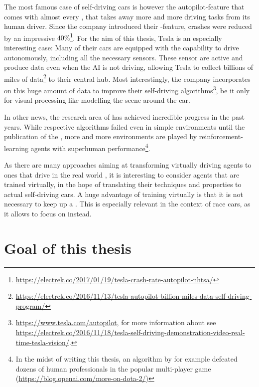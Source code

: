 The most famous case of self-driving cars is however the autopilot-feature that comes with almost every , that takes away more and more driving tasks from its human driver. Since the company introduced their -feature, crashes were reduced by an impressive $40\%$\footnote{\url{https://electrek.co/2017/01/19/tesla-crash-rate-autopilot-nhtsa/}}. For the aim of this thesis, Tesla is an especially interesting case: Many of their cars are equipped with the capability to drive autonomously, including all the necessary sensors. These sensor are active and produce data even when the AI is not driving, allowing Tesla to collect billions of miles of data\footnote{\url{https://electrek.co/2016/11/13/tesla-autopilot-billion-miles-data-self-driving-program/}} to their central hub. Most interestingly, the company incorporates  on this huge amount of data to improve their self-driving algorithms\footnote{\url{https://www.tesla.com/autopilot}, for more information about  see  \url{https://electrek.co/2016/11/18/tesla-self-driving-demonstration-video-real-time-tesla-vision/}.}, be it only for visual processing like modelling the scene around the car.

In other news, the research area of  has achieved incredible progress in the past years. While respective algorithms failed even in simple environments until the publication of the \cite{mnih_playing_2013}, more and more environments are played by reinforcement-learning agents with superhuman performance\footnote{In the midst of writing this thesis, an algorithm by  for example defeated dozens of human professionals in the popular multi-player game  (\url{https://blog.openai.com/more-on-dota-2/})}. 

As there are many approaches aiming at transforming virtually driving agents to ones that drive in the real world \cite{you_virtual_2017}, it is interesting to consider agents that are trained virtually, in the hope of translating their techniques and properties to actual self-driving cars. A huge advantage of training virtually is that it is not necessary to keep up a . This is especially relevant in the context of race cars, as it allows to focus on  instead.

\section{Goal of this thesis}

